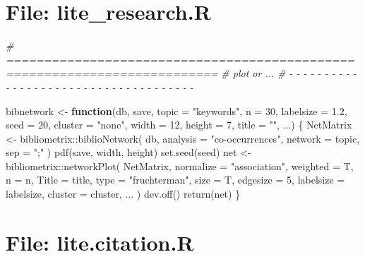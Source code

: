 \documentclass[
]{article}
\newenvironment{Shaded}{\begin{snugshade}}{\end{snugshade}}
\newcommand{\AttributeTok}[1]{\textcolor[rgb]{0.77,0.63,0.00}{#1}}
\newcommand{\CommentTok}[1]{\textcolor[rgb]{0.56,0.35,0.01}{\textit{#1}}}
\newcommand{\ControlFlowTok}[1]{\textcolor[rgb]{0.13,0.29,0.53}{\textbf{#1}}}
\newcommand{\DecValTok}[1]{\textcolor[rgb]{0.00,0.00,0.81}{#1}}
\newcommand{\FloatTok}[1]{\textcolor[rgb]{0.00,0.00,0.81}{#1}}
\newcommand{\FunctionTok}[1]{\textcolor[rgb]{0.00,0.00,0.00}{#1}}
\newcommand{\NormalTok}[1]{#1}
\newcommand{\OtherTok}[1]{\textcolor[rgb]{0.56,0.35,0.01}{#1}}
\newcommand{\SpecialCharTok}[1]{\textcolor[rgb]{0.00,0.00,0.00}{#1}}
\newcommand{\StringTok}[1]{\textcolor[rgb]{0.31,0.60,0.02}{#1}}
\begin{document}
\hypertarget{file-lite_research.r}{%
\section{File: lite\_research.R}\label{file-lite_research.r}}

\begin{Shaded}
\begin{Highlighting}[]
\CommentTok{\# ==========================================================================}
\CommentTok{\# plot or ...}
\CommentTok{\# {-} {-} {-} {-} {-} {-} {-} {-} {-} {-} {-} {-} {-} {-} {-} {-} {-} {-} {-} {-} {-} {-} {-} {-} {-} {-} {-} {-} {-} {-} {-} {-} {-} {-} {-} {-} {-}}

\NormalTok{bibnetwork }\OtherTok{\textless{}{-}} \ControlFlowTok{function}\NormalTok{(db, save, }\AttributeTok{topic =} \StringTok{"keywords"}\NormalTok{, }\AttributeTok{n =} \DecValTok{30}\NormalTok{,}
  \AttributeTok{labelsize =} \FloatTok{1.2}\NormalTok{, }\AttributeTok{seed =} \DecValTok{20}\NormalTok{, }\AttributeTok{cluster =} \StringTok{"none"}\NormalTok{, }\AttributeTok{width =} \DecValTok{12}\NormalTok{, }\AttributeTok{height =} \DecValTok{7}\NormalTok{,}
  \AttributeTok{title =} \StringTok{""}\NormalTok{, ...)}
\NormalTok{\{}
\NormalTok{  NetMatrix }\OtherTok{\textless{}{-}}\NormalTok{ bibliometrix}\SpecialCharTok{::}\FunctionTok{biblioNetwork}\NormalTok{(}
\NormalTok{    db, }\AttributeTok{analysis =} \StringTok{"co{-}occurrences"}\NormalTok{, }\AttributeTok{network =}\NormalTok{ topic, }\AttributeTok{sep =} \StringTok{";"}
\NormalTok{  )}
  \FunctionTok{pdf}\NormalTok{(save, width, height)}
  \FunctionTok{set.seed}\NormalTok{(seed)}
\NormalTok{  net }\OtherTok{\textless{}{-}}\NormalTok{ bibliometrix}\SpecialCharTok{::}\FunctionTok{networkPlot}\NormalTok{(}
\NormalTok{    NetMatrix, }\AttributeTok{normalize =} \StringTok{"association"}\NormalTok{,}
    \AttributeTok{weighted =}\NormalTok{ T, }\AttributeTok{n =}\NormalTok{ n, }\AttributeTok{Title =}\NormalTok{ title,}
    \AttributeTok{type =} \StringTok{"fruchterman"}\NormalTok{, }\AttributeTok{size =}\NormalTok{ T, }\AttributeTok{edgesize =} \DecValTok{5}\NormalTok{, }\AttributeTok{labelsize =}\NormalTok{ labelsize,}
    \AttributeTok{cluster =}\NormalTok{ cluster, ...}
\NormalTok{  )}
  \FunctionTok{dev.off}\NormalTok{()}
  \FunctionTok{return}\NormalTok{(net)}
\NormalTok{\}}
\end{Highlighting}
\end{Shaded}

\hypertarget{file-lite.citation.r}{%
\section{File: lite.citation.R}\label{file-lite.citation.r}}
\end{document}
